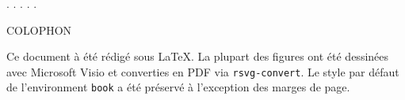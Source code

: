 . \newline
. \newline
. \newline
. \newline
. \newline





COLOPHON
\newline

Ce document à été rédigé sous \LaTeX. La plupart des figures ont été dessinées avec Microsoft Visio et converties en PDF via \texttt{rsvg-convert}. Le style par défaut de l'environment \texttt{book} a été préservé à l'exception des marges de page.
